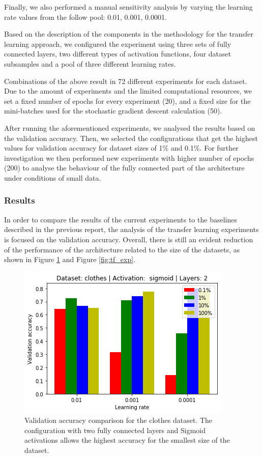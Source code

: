 \documentclass{article}
\begin{document}
Finally, we also performed a manual sensitivity analysis by varying the learning rate values from the follow pool: 0.01, 0.001, 0.0001.

Based on the description of the components in the methodology for the transfer learning approach, we configured the experiment using three sets of fully connected layers, two different types of activation functions, four dataset subsamples and a pool of three different learning rates.

Combinations of the above result in 72 different experiments for each dataset. Due to the amount of experiments and the limited computational resources, we set a fixed number of epochs for every experiment (20), and a fixed size for the mini-batches used for the stochastic gradient descent calculation (50).

After running the aforementioned experiments, we analysed the results based on the validation accuracy. Then, we selected the configurations that get the highest values for validation accuracy for dataset sizes of 1\% and 0.1\%. For further investigation we then performed new experiments with higher number of epochs (200) to analyse the behaviour of the fully connected part of the architecture under conditions of small data.

\subsubsection{\textbf{Results}}

In order to compare the results of the current experiments to the baselines described in the previous report, the analysis of the transfer learning experiments is focused on the validation accuracy. Overall, there is still an evident reduction of the performance of the architecture related to the size of the datasets, as shown in Figure \ref{fig:tf_clot} and Figure \ref{fig:tf_exp}.

\begin{figure}
    \vskip 5mm
        \begin{center}
            \includegraphics[scale=0.5]{accuracy_reduction_00.png}
            \caption{Validation accuracy comparison for the clothes dataset. The configuration with two fully connected layers and Sigmoid activations allows the highest accuracy for the smallest size of the dataset.}
            \label{fig:tf_clot}
        \end{center}
    \vskip -5mm
\end{figure}
\end{document}
